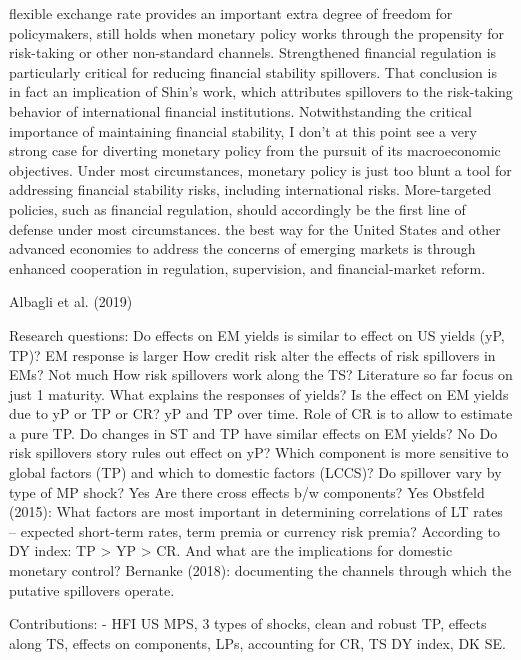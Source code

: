 flexible exchange rate provides an important extra degree of freedom for policymakers, still holds when monetary policy works through the propensity for risk-taking or other non-standard channels.
Strengthened financial regulation is particularly critical for reducing financial stability
spillovers. That conclusion is in fact an implication of Shin’s work, which attributes spillovers to the risk-taking behavior of international financial institutions.
Notwithstanding the critical importance of maintaining
financial stability, I don’t at this point see a very strong case for diverting monetary policy from the pursuit of its macroeconomic objectives.
Under most circumstances, monetary policy is just too blunt a tool for addressing financial stability risks, including international risks. More-targeted policies, such as financial regulation, should accordingly be the first line of defense under most circumstances.
the best way for the United States and other advanced economies to address the concerns of emerging markets is through enhanced cooperation in regulation, supervision, and financial-market reform. 


Albagli et al. (2019)



Research questions:
Do effects on EM yields is similar to effect on US yields (yP, TP)? EM response is larger
How credit risk alter the effects of risk spillovers in EMs? Not much
How risk spillovers work along the TS? Literature so far focus on just 1 maturity.
What explains the responses of yields? Is the effect on EM yields due to yP or TP or CR? yP and TP over time. Role of CR is to allow to estimate a pure TP.
Do changes in ST and TP have similar effects on EM yields? No
Do risk spillovers story rules out effect on yP?
Which component is more sensitive to global factors (TP) and which to domestic factors (LCCS)?
Do spillover vary by type of MP shock? Yes
Are there cross effects b/w components? Yes
Obstfeld (2015): What factors are most important in determining correlations of LT rates – expected short-term rates, term premia or currency risk premia? According to DY index: TP > YP > CR.
And what are the implications for domestic monetary control?
Bernanke (2018):  documenting the channels through which the putative spillovers operate.

Contributions:
- HFI US MPS, 3 types of shocks, clean and robust TP, effects along TS, effects on components, LPs, accounting for CR, TS DY index, DK SE.